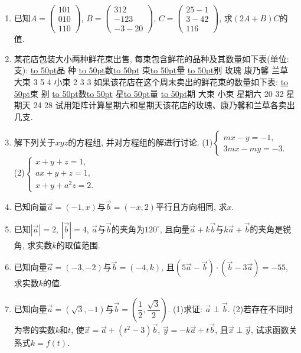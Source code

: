\documentclass[10pt,a4paper]{article}
\newcommand{\blank}[1]{\underline{\hbox to #1pt{}}}
\begin{document}
\begin{enumerate}[1.]
\item 已知$A=\begin{pmatrix}
    1  0  1  \\0  1  0  \\1  1  0  \end{pmatrix}$, $B=\begin{pmatrix}
    3  1  2  \\-1  2  3  \\-3  -2  0  \end{pmatrix}$, $C=\begin{pmatrix}
    2  5  -1  \\3  -4  2  \\1  1  6  \end{pmatrix}$, 求$(2A+B)C$的值.
\item 某花店包装大小两种鲜花束出售, 每束包含鲜花的品种及其数量如下表(单位: 支):
\blank{50}品  种
\blank{50}数\blank{50}
束\blank{50}量
\blank{50}别	玫瑰	康乃馨	兰草
大束	3	5	4
小束	2	3	3
如果该花店在这个周末卖出的鲜花束的数量如下表:
\blank{50}束  别
\blank{50}数\blank{50}
星\blank{50}量
\blank{50}期	大束	小束
星期六	20	32
星期天	24	28
试用矩阵计算星期六和星期天该花店的玫瑰、康乃馨和兰草各卖出几支.
\item 解下列关于$xyz$的方程组, 并对方程组的解进行讨论.
(1)$\begin{cases}
    mx-y=-1,  \\3mx-my=-3.  \end{cases}$ (2)$\begin{cases}
    x+y+z=1,  \\ax+y+z=1,  \\x+y+a^2z=2.  \end{cases}$
\item 已知向量$\overrightarrow a=(-1,x)$与$\overrightarrow b=(-x,2)$平行且方向相同, 求$x$.
\item 已知$|\overrightarrow a|=2$, $|\overrightarrow b|=4$, $\overrightarrow a$与$\overrightarrow b$的夹角为$120^{\circ }$, 且向量$\overrightarrow a+k\overrightarrow b$与$k\overrightarrow a+\overrightarrow b$的夹角是锐角, 求实数$k$的取值范围.
\item 已知向量$\overrightarrow a=(-3,-2)$与$\overrightarrow b=(-4,k)$, 且$(5\overrightarrow a-\overrightarrow b)\cdot (\overrightarrow b-3\overrightarrow a)=-55$, 求实数$k$的值.
\item 已知向量$\overrightarrow a=(\sqrt 3,-1)$与$\overrightarrow b=(\dfrac 12,\dfrac{\sqrt 3}2)$.
(1)求证: $\overrightarrow a\perp \overrightarrow b$.
(2)若存在不同时为零的实数$k$和$t$, 使$\overrightarrow x=\overrightarrow a+(t^2-3)\overrightarrow b$, $\overrightarrow y=-k\overrightarrow a+t\overrightarrow b$, 且$\overrightarrow x\perp \overrightarrow y$, 试求函数关系式$k=f(t)$.

\end{enumerate}
\end{document}
